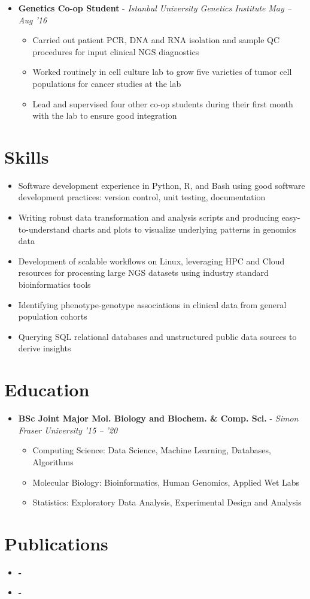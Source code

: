 \documentclass{article}
\newcommand{\experienceheader}[3]{\item \textbf{#1} - \textit{#2} \hfill \textit{#3} \vspace{-.2em}}
\newcommand{\customsection}[1]{\section*{#1} \vspace{-1em} \hrulefill \vspace{-.5em}}
\begin{document}
\begin{itemize}
  \experienceheader{Genetics Co-op Student}{Istanbul University Genetics Institute}{May -- Aug '16}
    \begin{itemize}
      \item Carried out patient PCR, DNA and RNA isolation and sample QC procedures for input clinical NGS diagnostics
      \item Worked routinely in cell culture lab to grow five varieties of tumor cell populations for cancer studies at the lab
      \item Lead and supervised four other co-op students during their first month with the lab to ensure good integration
    \end{itemize}
\end{itemize}


\customsection{Skills}
\begin{itemize}
  \item Software development experience in Python, R, and Bash using good software development practices: version control, unit testing, documentation 
  \item Writing robust data transformation and analysis scripts and producing easy-to-understand charts and plots to visualize underlying patterns in genomics data
  \item Development of scalable workflows on Linux, leveraging HPC and Cloud resources for processing large NGS datasets using industry standard bioinformatics tools
  \item Identifying phenotype-genotype associations in clinical data from general population cohorts
  \item Querying SQL relational databases and unstructured public data sources to derive insights
\end{itemize}


\customsection{Education}
\begin{itemize}
\experienceheader{BSc Joint Major Mol. Biology and Biochem. \& Comp. Sci.}{Simon Fraser University}{'15 -- '20}
  \begin{itemize}
    \item Computing Science: Data Science, Machine Learning, Databases, Algorithms
    \item Molecular Biology: Bioinformatics, Human Genomics, Applied Wet Labs
    \item Statistics: Exploratory Data Analysis, Experimental Design and Analysis
  \end{itemize}
\end{itemize}



\customsection{Publications}
\begin{itemize}
  \item \textbf{-} 
  \item \textbf{-} 
\end{itemize}
\end{document}
